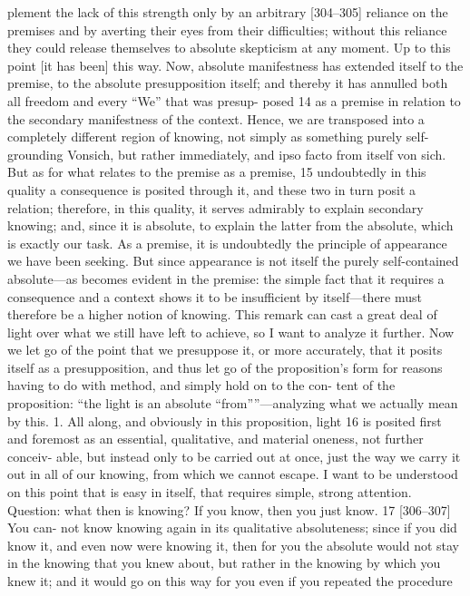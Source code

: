 plement the lack of this strength only by an arbitrary [304–305] reliance on
the premises and by averting their eyes from their difficulties; without this
reliance they could release themselves to absolute skepticism at any moment.
Up to this point [it has been] this way. Now, absolute manifestness has
extended itself to the premise, to the absolute presupposition itself; and
thereby it has annulled both all freedom and every “We” that was presup-
posed 14 as a premise in relation to the secondary manifestness of the context.
Hence, we are transposed into a completely different region of knowing, not
simply as something purely self-grounding {Vonsich}, but rather immediately,
and ipso facto from itself {von sich}. But as for what relates to the premise as a
premise, 15 undoubtedly in this quality a consequence is posited through it, and
these two in turn posit a relation; therefore, in this quality, it serves admirably
to explain secondary knowing; and, since it is absolute, to explain the latter
from the absolute, which is exactly our task. As a premise, it is undoubtedly
the principle of appearance we have been seeking. But since appearance is not
itself the purely self-contained absolute—as becomes evident in the premise:
the simple fact that it requires a consequence and a context shows it to be
insufficient by itself—there must therefore be a higher notion of knowing.
This remark can cast a great deal of light over what we still have left to
achieve, so I want to analyze it further.
Now we let go of the point that we presuppose it, or more accurately,
that it posits itself as a presupposition, and thus let go of the proposition’s
form for reasons having to do with method, and simply hold on to the con-
tent of the proposition: “the light is an absolute “from””—analyzing what we
actually mean by this.
1. All along, and obviously in this proposition, light 16 is posited first and
foremost as an essential, qualitative, and material oneness, not further conceiv-
able, but instead only to be carried out at once, just the way we carry it out in
all of our knowing, from which we cannot escape. I want to be understood on
this point that is easy in itself, that requires simple, strong attention. Question:
what then is knowing? If you know, then you just know. 17 [306–307] You can-
not know knowing again in its qualitative absoluteness; since if you did know
it, and even now were knowing it, then for you the absolute would not stay in
the knowing that you knew about, but rather in the knowing by which you
knew it; and it would go on this way for you even if you repeated the procedure
